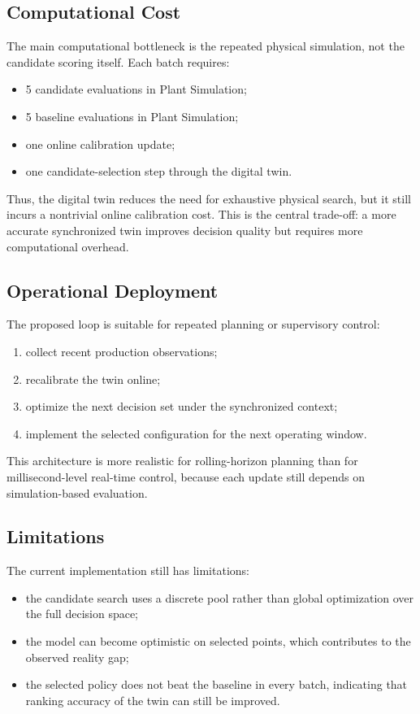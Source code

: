 \documentclass[11pt]{article}
\begin{document}
\subsection{Computational Cost}
The main computational bottleneck is the repeated physical simulation, not the candidate scoring itself. Each batch requires:
\begin{itemize}[leftmargin=1.5em]
    \item 5 candidate evaluations in Plant Simulation;
    \item 5 baseline evaluations in Plant Simulation;
    \item one online calibration update;
    \item one candidate-selection step through the digital twin.
\end{itemize}

Thus, the digital twin reduces the need for exhaustive physical search, but it still incurs a nontrivial online calibration cost. This is the central trade-off: a more accurate synchronized twin improves decision quality but requires more computational overhead.

\subsection{Operational Deployment}
The proposed loop is suitable for repeated planning or supervisory control:
\begin{enumerate}[leftmargin=1.5em]
    \item collect recent production observations;
    \item recalibrate the twin online;
    \item optimize the next decision set under the synchronized context;
    \item implement the selected configuration for the next operating window.
\end{enumerate}

This architecture is more realistic for rolling-horizon planning than for millisecond-level real-time control, because each update still depends on simulation-based evaluation.

\subsection{Limitations}
The current implementation still has limitations:
\begin{itemize}[leftmargin=1.5em]
    \item the candidate search uses a discrete pool rather than global optimization over the full decision space;
    \item the model can become optimistic on selected points, which contributes to the observed reality gap;
    \item the selected policy does not beat the baseline in every batch, indicating that ranking accuracy of the twin can still be improved.
\end{itemize}
\end{document}

